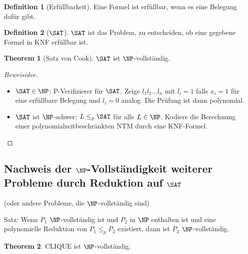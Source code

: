 \documentclass[11pt]{article} %
\theoremstyle{definition}
\newtheorem{definition}{Definition}
\newtheorem{theorem}{Theorem}
\begin{document}
\begin{definition}[Erfüllbarkeit]
Eine Formel ist erfüllbar, wenn es eine Belegung dafür gibt.
\end{definition}

\begin{definition}[$\SAT$]
$\SAT$ ist das Problem, zu entscheiden, ob eine gegebene Formel in KNF erfüllbar ist.
\end{definition}

\begin{theorem}[Satz von Cook]
$\SAT$ ist $\NP$-vollständig.
\end{theorem}

\begin{proof}[Beweisidee]
\begin{itemize}
\item $\SAT \in \NP$: P-Verifizierer für $\SAT$. Zeige $l_1l_2\dots l_n$ mit $l_i = 1$ falls $x_i = 1$ für eine erfüllbare Belegung und $l_i = 0$ analog. Die Prüfung ist dann polynomial.
\item $\SAT$ ist $\NP$-schwer: $L \le_p \SAT$ für alle $L \in \NP$. Kodiere die Berechnung einer polynomialzeitbeschränkten NTM durch eine KNF-Formel.
\end{itemize}
\end{proof}

\subsection{Nachweis der $\NP$-Vollständigkeit weiterer Probleme durch Reduktion auf $\SAT$}

(oder andere Probleme, die $\NP$-vollständig sind)

Satz: Wenn $P_1$ $\NP$-vollständig ist und $P_2$ in $\NP$ enthalten ist und eine polynomielle Reduktion von $P_1\le_p P_2$ existiert, dann ist $P_2$ $\NP$-vollständig.

\newcommand{\CLIQUE}{\mathrm{CLIQUE}}

\begin{theorem}
$\CLIQUE$ ist $\NP$-vollständig.
\end{theorem}
\end{document}
